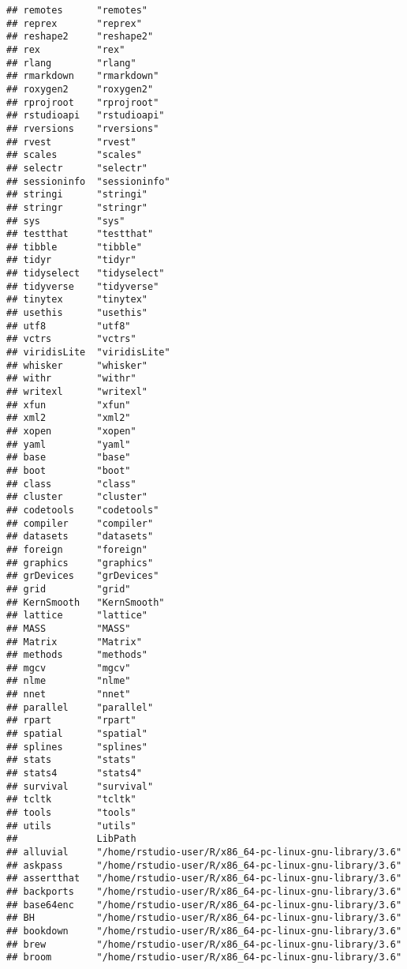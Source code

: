 \documentclass[]{book}
\begin{document}
\begin{verbatim}
## remotes      "remotes"     
## reprex       "reprex"      
## reshape2     "reshape2"    
## rex          "rex"         
## rlang        "rlang"       
## rmarkdown    "rmarkdown"   
## roxygen2     "roxygen2"    
## rprojroot    "rprojroot"   
## rstudioapi   "rstudioapi"  
## rversions    "rversions"   
## rvest        "rvest"       
## scales       "scales"      
## selectr      "selectr"     
## sessioninfo  "sessioninfo" 
## stringi      "stringi"     
## stringr      "stringr"     
## sys          "sys"         
## testthat     "testthat"    
## tibble       "tibble"      
## tidyr        "tidyr"       
## tidyselect   "tidyselect"  
## tidyverse    "tidyverse"   
## tinytex      "tinytex"     
## usethis      "usethis"     
## utf8         "utf8"        
## vctrs        "vctrs"       
## viridisLite  "viridisLite" 
## whisker      "whisker"     
## withr        "withr"       
## writexl      "writexl"     
## xfun         "xfun"        
## xml2         "xml2"        
## xopen        "xopen"       
## yaml         "yaml"        
## base         "base"        
## boot         "boot"        
## class        "class"       
## cluster      "cluster"     
## codetools    "codetools"   
## compiler     "compiler"    
## datasets     "datasets"    
## foreign      "foreign"     
## graphics     "graphics"    
## grDevices    "grDevices"   
## grid         "grid"        
## KernSmooth   "KernSmooth"  
## lattice      "lattice"     
## MASS         "MASS"        
## Matrix       "Matrix"      
## methods      "methods"     
## mgcv         "mgcv"        
## nlme         "nlme"        
## nnet         "nnet"        
## parallel     "parallel"    
## rpart        "rpart"       
## spatial      "spatial"     
## splines      "splines"     
## stats        "stats"       
## stats4       "stats4"      
## survival     "survival"    
## tcltk        "tcltk"       
## tools        "tools"       
## utils        "utils"       
##              LibPath                                               
## alluvial     "/home/rstudio-user/R/x86_64-pc-linux-gnu-library/3.6"
## askpass      "/home/rstudio-user/R/x86_64-pc-linux-gnu-library/3.6"
## assertthat   "/home/rstudio-user/R/x86_64-pc-linux-gnu-library/3.6"
## backports    "/home/rstudio-user/R/x86_64-pc-linux-gnu-library/3.6"
## base64enc    "/home/rstudio-user/R/x86_64-pc-linux-gnu-library/3.6"
## BH           "/home/rstudio-user/R/x86_64-pc-linux-gnu-library/3.6"
## bookdown     "/home/rstudio-user/R/x86_64-pc-linux-gnu-library/3.6"
## brew         "/home/rstudio-user/R/x86_64-pc-linux-gnu-library/3.6"
## broom        "/home/rstudio-user/R/x86_64-pc-linux-gnu-library/3.6"

\end{verbatim}
\end{document}
